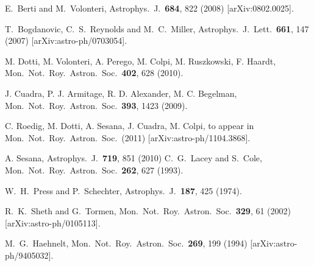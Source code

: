 \documentclass{iopart}
\begin{document}
\begin{thebibliography}{}
  E.~Berti and M.~Volonteri,
  Astrophys.\ J.\  {\bf 684}, 822 (2008)
  [arXiv:0802.0025].


  T.~Bogdanovic, C.~S.~Reynolds and M.~C.~Miller,
  Astrophys.\ J.\ Lett.\ {\bf 661}, 147 (2007)
  [arXiv:astro-ph/0703054].

M. Dotti, M. Volonteri, A. Perego, M. Colpi, M. Ruszkowski, F. Haardt, 
  Mon.\ Not.\ Roy.\ Astron.\ Soc.\  {\bf 402}, 628 (2010).

J. Cuadra, P. J. Armitage, R. D. Alexander, M. C. Begelman, 
  Mon.\ Not.\ Roy.\ Astron.\ Soc.\  {\bf 393}, 1423 (2009).

C. Roedig, M. Dotti, A. Sesana, J. Cuadra, M. Colpi,
to appear in Mon.\ Not.\ Roy.\ Astron.\ Soc.\ (2011)
  [arXiv:astro-ph/1104.3868].

A. Sesana, 
  Astrophys.\ J.\  {\bf 719}, 851 (2010)
  C.~G.~Lacey and S.~Cole,
  Mon.\ Not.\ Roy.\ Astron.\ Soc.\  {\bf 262}, 627 (1993).

  W.~H.~Press and P.~Schechter,
  Astrophys.\ J.\  {\bf 187}, 425 (1974).

  R.~K.~Sheth and G.~Tormen,
  Mon.\ Not.\ Roy.\ Astron.\ Soc.\  {\bf 329}, 61 (2002)
  [arXiv:astro-ph/0105113].

  M.~G.~Haehnelt,
  Mon.\ Not.\ Roy.\ Astron.\ Soc.\  {\bf 269}, 199 (1994)
  [arXiv:astro-ph/9405032].


\end{thebibliography}
\end{document}
